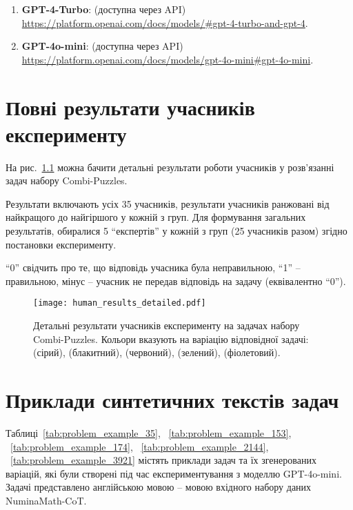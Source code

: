 \begin{enumerate}
    \item \textbf{GPT-4-Turbo}: (доступна через API)\\ 
    \url{https://platform.openai.com/docs/models/#gpt-4-turbo-and-gpt-4}.
    \item \textbf{GPT-4o-mini}: (доступна через API)\\
    \url{https://platform.openai.com/docs/models/gpt-4o-mini#gpt-4o-mini}.
\end{enumerate}

\chapter{Повні результати учасників експерименту}
\label{sec:humans-results-detailed}
\vspace*{-1\baselineskip}

На рис.~\ref{fig:human_results_detailed} можна бачити детальні результати роботи учасників у розв'язанні задач набору Combi-Puzzles.

Результати включають усіх 35 учасників, результати учасників ранжовані від найкращого до найгіршого у кожній з груп. Для формування загальних результатів, обиралися 5 ``експертів'' у кожній з груп (25 учасників разом) згідно постановки експерименту.

``0'' свідчить про те, що відповідь учасника була неправильною, ``1'' -- правильною, мінус -- учасник не передав відповідь на задачу (еквівалентно ``0'').

\begin{figure}
    \centering
    \texttt{[image: human\_results\_detailed.pdf]}
    \caption{Детальні результати учасників експерименту на задачах набору Combi-Puzzles. Кольори вказують на варіацію відповідної задачі:  (сірий),  (блакитний),  (червоний),  (зелений),  (фіолетовий).}
    \label{fig:human_results_detailed}
\end{figure}

\chapter{Приклади синтетичних текстів задач}
\label{sec:problems-synthetic}
\vspace*{-1\baselineskip}

Таблиці~\ref{tab:problem_example_35}, ~\ref{tab:problem_example_153}, ~\ref{tab:problem_example_174}, ~\ref{tab:problem_example_2144}, ~\ref{tab:problem_example_3921} містять приклади задач та їх згенерованих варіацій, які були створені під час експериментування з моделлю GPT-4o-mini. Задачі представлено англійською мовою -- мовою вхідного набору даних NuminaMath-CoT.

